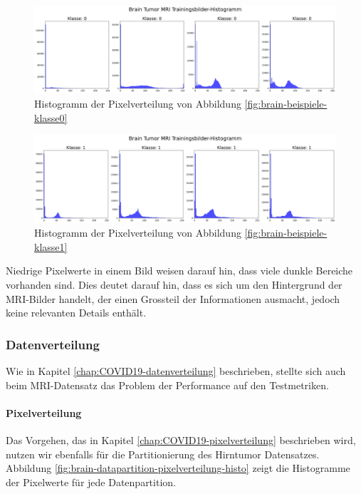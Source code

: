 \begin{figure}[H]
    \centering
    \includegraphics[width=\linewidth]{01-images/03-data/brain-klasse0-hist.png}
    \caption{Histogramm der Pixelverteilung von Abbildung \ref{fig:brain-beispiele-klasse0}}
    \label{fig:brain-klasse0-hist}
\end{figure}

\begin{figure}[H]
    \centering
    \includegraphics[width=\linewidth]{01-images/03-data/brain-klasse1-hist.png}
    \caption{Histogramm der Pixelverteilung von Abbildung \ref{fig:brain-beispiele-klasse1}}
    \label{fig:brain-klasse1-hist}
\end{figure}

Niedrige Pixelwerte in einem Bild weisen darauf hin, dass viele dunkle Bereiche vorhanden sind. Dies deutet darauf hin, dass es sich um den Hintergrund der MRI-Bilder handelt, der einen Grossteil der Informationen ausmacht, jedoch keine relevanten Details enthält.

\subsubsection{Datenverteilung} \label{chap:brain-datenverteilung}
Wie in Kapitel \ref{chap:COVID19-datenverteilung} beschrieben, stellte sich auch beim MRI-Datensatz das Problem der Performance auf den Testmetriken.

\paragraph{Pixelverteilung} \label{chap:brain-pixelverteilung}
Das Vorgehen, das in Kapitel \ref{chap:COVID19-pixelverteilung} beschrieben wird, nutzen wir ebenfalls für die Partitionierung des Hirntumor Datensatzes. Abbildung \ref{fig:brain-datapartition-pixelverteilung-histo} zeigt die Histogramme der Pixelwerte für jede Datenpartition.


